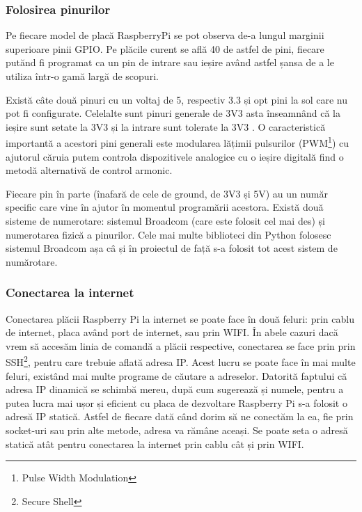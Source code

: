 \documentclass[../IoMusT.tex]{subfiles}
\begin{document}
\subsubsection{Folosirea pinurilor}
Pe fiecare model de placă RaspberryPi se pot observa de-a lungul marginii  superioare pinii GPIO. Pe plăcile curent se află 40 de astfel de pini, fiecare putănd fi programat ca un pin de intrare sau ieșire având astfel șansa de a le utiliza într-o gamă largă de scopuri.
\\
\par Există câte două pinuri cu un voltaj de 5, respectiv 3.3 și opt pini la sol care nu pot fi configurate. Celelalte sunt pinuri generale de 3V3 asta înseamnând că la ieșire sunt setate la 3V3 și la intrare sunt tolerate la 3V3 \cite{RaspPi}. O caracteristică importantă a acestori pini generali este modularea lățimii pulsurilor (PWM\footnote{Pulse Width Modulation}) cu ajutorul căruia putem controla dispozitivele analogice cu o ieșire digitală \cite{PWM} find o metodă alternativă de control armonic. 
\\
\par Fiecare pin în parte (înafară de cele de ground, de 3V3 și 5V) au un număr specific care vine în ajutor în momentul programării acestora. Există două sisteme de numerotare: sistemul Broadcom (care este folosit cel mai des) și numerotarea fizică a pinurilor. Cele mai multe biblioteci din Python folosesc sistemul Broadcom așa câ și în proiectul de față s-a folosit tot acest sistem de numărotare.

\subsubsection{Conectarea la internet}
Conectarea plăcii Raspberry Pi la internet se poate face în două feluri: prin cablu de internet, placa având port de internet, sau prin WIFI. În abele cazuri dacă vrem să accesăm linia de comandă a plăcii respective, conectarea se face prin prin SSH\footnote{Secure Shell}, pentru care trebuie aflată adresa IP. Acest lucru se poate face în mai multe feluri, existând mai multe programe de căutare a adreselor. Datorită faptului că adresa IP dinamică se schimbă mereu, după cum sugerează și numele, pentru a putea lucra mai ușor și eficient cu placa de dezvoltare Raspberry Pi s-a folosit o adresă IP statică. Astfel de fiecare dată când dorim să ne conectăm la ea, fie prin socket-uri sau prin alte metode, adresa va rămâne aceași. Se poate seta o adresă statică atât pentru conectarea la internet prin cablu cât și prin WIFI.
\end{document}
